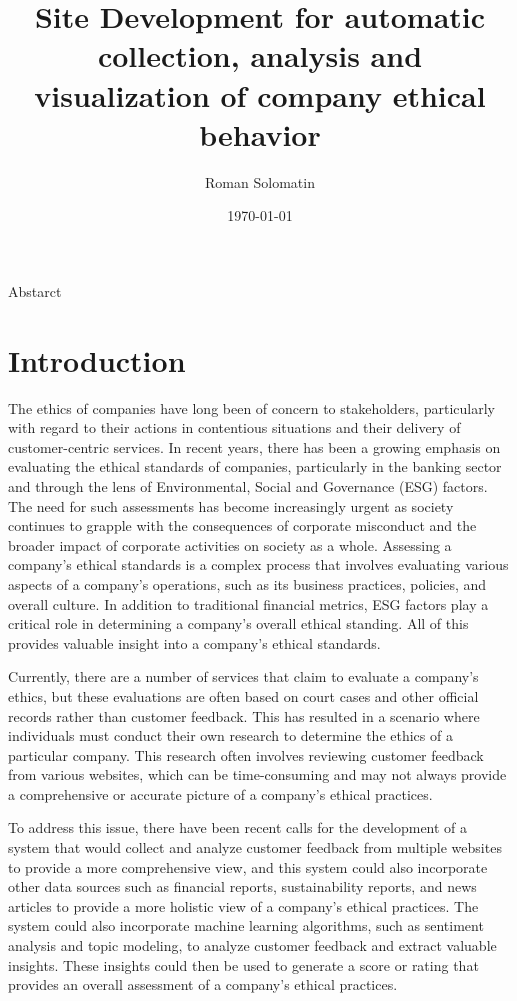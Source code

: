 \documentclass[PI]{ProjectProposal}
\author{Roman Solomatin}
\date{\today}
\title{Site Development for automatic collection, analysis and visualization of company ethical behavior}
\begin{document}
\maketitle
Abstarct

\chapter{Introduction}
\label{sec:org731cc90}
The ethics of companies have long been of concern to stakeholders, particularly with regard to their actions in contentious situations and their delivery of customer-centric services. In recent years, there has been a growing emphasis on evaluating the ethical standards of companies, particularly in the banking sector and through the lens of Environmental, Social and Governance (ESG) factors\autocites{mure_esg_2021}[][]{miralles-quiros_esg_2019}[][]{climent_ethical_2018}. The need for such assessments has become increasingly urgent as society continues to grapple with the consequences of corporate misconduct and the broader impact of corporate activities on society as a whole.
\citet{mure2021esg} \textcite{mure2021esg}
Assessing a company's ethical standards is a complex process that involves evaluating various aspects of a company's operations, such as its business practices, policies, and overall culture. In addition to traditional financial metrics, ESG factors play a critical role in determining a company's overall ethical standing. All of this provides valuable insight into a company's ethical standards.

Currently, there are a number of services that claim to evaluate a company's ethics, but these evaluations are often based on court cases and other official records rather than customer feedback. This has resulted in a scenario where individuals must conduct their own research to determine the ethics of a particular company. This research often involves reviewing customer feedback from various websites, which can be time-consuming and may not always provide a comprehensive or accurate picture of a company's ethical practices.

To address this issue, there have been recent calls for the development of a system that would collect and analyze customer feedback from multiple websites to provide a more comprehensive view, and this system could also incorporate other data sources such as financial reports, sustainability reports, and news articles to provide a more holistic view of a company's ethical practices. The system could also incorporate machine learning algorithms, such as sentiment analysis and topic modeling, to analyze customer feedback and extract valuable insights. These insights could then be used to generate a score or rating that provides an overall assessment of a company's ethical practices.
\end{document}
